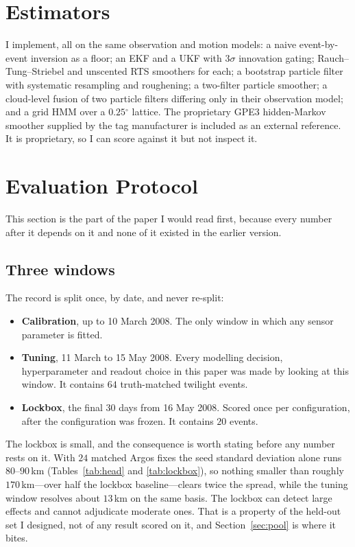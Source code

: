 \documentclass[conference]{IEEEtran}
\providecommand{\degree}{\ensuremath{^\circ}}
\begin{document}
\section{Estimators}
I implement, all on the same observation and motion models: a naive
event-by-event inversion as a floor; an EKF and a UKF with $3\sigma$ innovation
gating; Rauch--Tung--Striebel and unscented RTS smoothers for each; a bootstrap
particle filter with systematic resampling and roughening; a two-filter particle
smoother; a cloud-level fusion of two particle filters differing only in their
observation model; and a grid HMM over a $0.25\degree$ lattice. The proprietary
GPE3 hidden-Markov smoother supplied by the tag manufacturer is included as an
external reference. It is proprietary, so I can score against it but not
inspect it.

\section{Evaluation Protocol}
\label{sec:proto}
This section is the part of the paper I would read first, because every number
after it depends on it and none of it existed in the earlier version.

\subsection{Three windows}
The record is split once, by date, and never re-split:
\begin{itemize}
\item \textbf{Calibration}, up to 10 March 2008. The only window in which any
sensor parameter is fitted.
\item \textbf{Tuning}, 11 March to 15 May 2008. Every modelling decision,
hyperparameter and readout choice in this paper was made by looking at this
window. It contains $64$ truth-matched twilight events.
\item \textbf{Lockbox}, the final 30 days from 16 May 2008. Scored once per
configuration, after the configuration was frozen. It contains $20$ events.
\end{itemize}
The lockbox is small, and the consequence is worth stating before any number
rests on it. With $24$ matched Argos fixes the seed standard deviation alone
runs $80$--$90$\,\si{\km} (Tables~\ref{tab:head} and \ref{tab:lockbox}), so
nothing smaller than roughly $170$\,\si{\km}---over half the lockbox
baseline---clears twice the spread, while the tuning window resolves about
$13$\,\si{\km} on the same basis. The lockbox can detect large effects and
cannot adjudicate moderate ones. That is a property of the held-out set I
designed, not of any result scored on it, and Section~\ref{sec:pool} is where
it bites.
\end{document}
